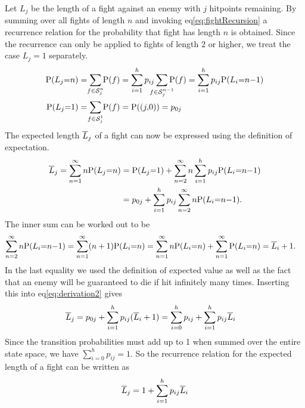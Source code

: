 Let $L_j$ be the length of a fight against an enemy with $j$ hitpoints remaining.
By summing over all fights of length $n$ and invoking eq\ref{eq:fightRecursion} a recurrence relation for the probability that fight has length $n$ is obtained. Since the recurrence can only be applied to fights of length $2$ or higher, we treat the case $L_j = 1$ separately.
\begin{align}\label{eq:probabilityRecursion}
    \Pr{L_j = n} &= \sum_{\mathclap{f \in \mathcal{S}_j^n}}\Pr{f}
            = \sum_{i=1}^h p_{ij} \sum_{\mathclap{f \in \mathcal{S}_j^{n-1}}}\Pr{f}
            = \sum_{i=1}^h p_{ij} \Pr{L_i = n-1}\\
    \Pr{L_j = 1} &= \sum_{\mathclap{f \in \mathcal{S}_j^1}}\Pr{f}
            = \Pr{(j,0}) = p_{0j}
\end{align}
The expected length $\overline{L}_j$ of a fight can now be expressed using the definition of expectation.
\begin{align}
    \L_j = \sum_{n=1}^{\infty}n\Pr{L_j=n}
       &= \Pr{L_j=1} + \sum_{n=2}^{\infty}n\sum_{i=1}^h p_{ij} \Pr{L_i=n-1}\nonumber\\
       &= p_{0j} + \sum_{i=1}^h p_{ij} \sum_{n=2}^{\infty}n\Pr{L_i=n-1}.\label{eq:derivation2}
\end{align}
The inner sum can be worked out to be
\begin{align}
    \sum_{n=2}^{\infty}n\Pr{L_i=n-1}
       &= \sum_{n=1}^{\infty}(n+1)\Pr{L_i=n} \nonumber
       = \sum_{n=1}^{\infty}n\Pr{L_i=n} + \sum_{n=1}^{\infty}\Pr{L_i=n}
       = \L_i + 1.
\end{align}
In the last equality we used the definition of expected value as well as the fact that an enemy will be guaranteed to die if hit infinitely many times. Inserting this into eq\ref{eq:derivation2} gives
\begin{align}
    \overline{L}_j
        &= p_{0j} + \sum_{i=1}^h p_{ij}(\overline{L}_i+1)
        = \sum_{i=0}^h p_{ij} + \sum_{i=1}^h p_{ij}\overline{L}_i
\end{align}
Since the transition probabilities must add up to 1 when summed over the entire state space, we have $\sum_{i=0}^{h}p_{ij} = 1$. So the recurrence relation for the expected length of a fight can be written as
\begin{align}
    \overline{L}_j
        = 1 + \sum_{i=1}^h p_{ij}\overline{L}_i\label{eq:fightLengthRecursion}
\end{align}
